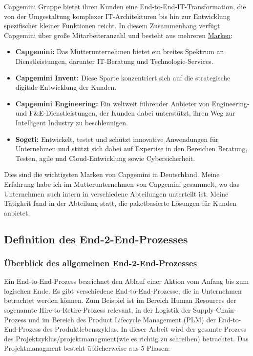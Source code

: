 \documentclass[a4paper, 12pt]{scrartcl}
\begin{document}
Capgemini Gruppe bietet ihren Kunden eine End-to-End-IT-Transformation, die von der Umgestaltung komplexer IT-Architekturen bis hin zur Entwicklung spezifischer kleiner Funktionen reicht. In diesem Zusammenhang verfügt Capgemini über große Mitarbeiteranzahl und besteht aus mehreren \href{https://www.capgemini.com/de-de/unternehmen/wer-wir-sind/unsere-marken/}{ Marken}:
	\begin{itemize}
		\item \textbf{Capgemini:} Das Mutterunternehmen bietet ein breites Spektrum an Dienstleistungen, darunter IT-Beratung und Technologie-Services.
		
		\item \textbf{Capgemini Invent:} Diese Sparte konzentriert sich auf die strategische digitale Entwicklung der Kunden.
		\item \textbf{Capgemini Engineering:} Ein weltweit führender Anbieter von Engineering- und F\&E-Dienstleistungen, der Kunden dabei unterstützt, ihren Weg zur Intelligent Industry zu beschleunigen.
		\item \textbf{Sogeti:} Entwickelt, testet und schützt innovative Anwendungen für Unternehmen und stützt sich dabei auf Expertise in den Bereichen Beratung, Testen, agile und Cloud-Entwicklung sowie Cybersicherheit.
	\end{itemize}
Dies sind die wichtigsten Marken von Capgemini in Deutschland. Meine Erfahrung habe ich im Mutterunternehmen von Capgemini gesammelt, wo das Unternehmen auch intern in verschiedene Abteilungen unterteilt ist. Meine Tätigkeit fand in der Abteilung statt, die paketbasierte Lösungen %
  für Kunden anbietet.


	\newpage
	\subsection{Definition des End-2-End-Prozesses}
	\subsubsection{Überblick des allgemeinen End-2-End-Prozesses} %
Ein End-to-End-Prozess bezeichnet den Ablauf einer Aktion vom Anfang bis zum logischen Ende. Es gibt verschiedene End-to-End-Prozesse, die in Unternehmen betrachtet werden können. Zum Beispiel ist im Bereich Human Resources der sogenannte Hire-to-Retire-Prozess relevant, in der Logistik der Supply-Chain-Prozess und im Bereich des Product Lifecycle Management (PLM) der End-to-End-Prozess des Produktlebenszyklus.
\newline
In dieser Arbeit wird der gesamte Prozess des Projektzyklus/projektmanagment(wie es richtig zu schreiben) betrachtet. Das Projektmanagment besteht üblicherweise aus 5 Phasen\cite{timinger2024modernes}:
\end{document}
